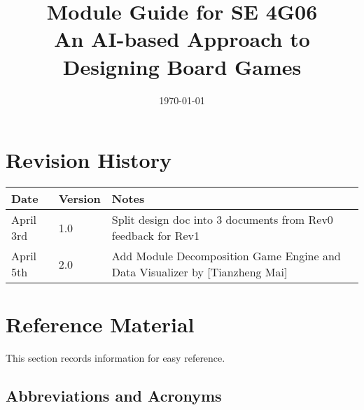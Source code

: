 \documentclass[12pt, titlepage]{article}
\begin{document}
\title{Module Guide for SE 4G06 \\ An AI-based Approach to Designing Board Games} 
\author{\authname{}}
\date{\today}
\author{\authname}


\maketitle


\section{Revision History}

\begin{tabularx}{\textwidth}{p{3cm}p{2cm}X}
\toprule {\bf Date} & {\bf Version} & {\bf Notes}\\
\midrule
April 3rd & 1.0 & Split design doc into 3 documents from Rev0 feedback for Rev1\\
April 5th & 2.0 & Add Module Decomposition Game Engine and Data Visualizer by [Tianzheng Mai]\\
\bottomrule
\end{tabularx}

\newpage

\section{Reference Material}

This section records information for easy reference.

\subsection{Abbreviations and Acronyms}
\end{document}
